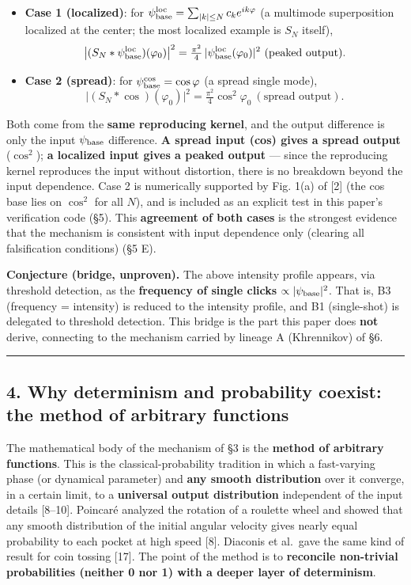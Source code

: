 \documentclass[
]{ltjsarticle}
\providecommand{\tightlist}{%
  \setlength{\itemsep}{0pt}\setlength{\parskip}{0pt}}
\begin{document}
\begin{itemize}
\tightlist
\item
  \textbf{Case 1 (localized)}: for
  \(\psi_{\rm base}^{\rm loc}=\sum_{|k|\le N}c_k e^{ik\varphi}\) (a
  multimode superposition localized at the center; the most localized
  example is \(S_N\) itself),
  \[\big|(S_N*\psi_{\rm base}^{\rm loc})(\varphi_0)\big|^2=\tfrac{\pi^2}{4}\,|\psi_{\rm base}^{\rm loc}(\varphi_0)|^2\ (\text{peaked output}).\]
\item
  \textbf{Case 2 (spread)}: for \(\psi_{\rm base}^{\cos}=\cos\varphi\)
  (a spread single mode),
  \[\big|(S_N*\cos)(\varphi_0)\big|^2=\tfrac{\pi^2}{4}\cos^2\varphi_0\ (\text{spread output}).\]
\end{itemize}

Both come from the \textbf{same reproducing kernel}, and the output
difference is only the input \(\psi_{\rm base}\) difference. \textbf{A
spread input (cos) gives a spread output} (\(\cos^2\)); \textbf{a
localized input gives a peaked output} --- since the reproducing kernel
reproduces the input without distortion, there is no breakdown beyond
the input dependence. Case 2 is numerically supported by Fig. 1(a) of
{[}2{]} (the cos base lies on \(\cos^2\) for all \(N\)), and is included
as an explicit test in this paper's verification code (§5). This
\textbf{agreement of both cases} is the strongest evidence that the
mechanism is consistent with input dependence only (clearing all
falsification conditions) (§5 E).

\textbf{Conjecture (bridge, unproven).} The above intensity profile
appears, via threshold detection, as the \textbf{frequency of single
clicks} \(\propto|\psi_{\rm base}|^2\). That is, B3 (frequency =
intensity) is reduced to the intensity profile, and B1 (single-shot) is
delegated to threshold detection. This bridge is the part this paper
does \textbf{not} derive, connecting to the mechanism carried by lineage
A (Khrennikov) of §6.

\begin{center}\rule{0.5\linewidth}{0.5pt}\end{center}

\subsection{4. Why determinism and probability coexist: the method of
arbitrary
functions}\label{why-determinism-and-probability-coexist-the-method-of-arbitrary-functions}

The mathematical body of the mechanism of §3 is the \textbf{method of
arbitrary functions}. This is the classical-probability tradition in
which a fast-varying phase (or dynamical parameter) and \textbf{any
smooth distribution} over it converge, in a certain limit, to a
\textbf{universal output distribution} independent of the input details
{[}8--10{]}. Poincaré analyzed the rotation of a roulette wheel and
showed that any smooth distribution of the initial angular velocity
gives nearly equal probability to each pocket at high speed {[}8{]}.
Diaconis et al.~gave the same kind of result for coin tossing {[}17{]}.
The point of the method is to \textbf{reconcile non-trivial
probabilities (neither 0 nor 1) with a deeper layer of determinism}.
\end{document}
